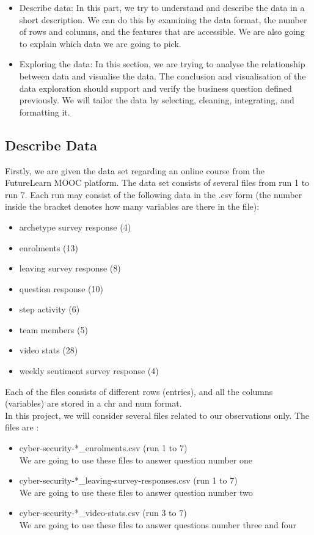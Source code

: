 \documentclass[12pt,]{article}
\providecommand{\tightlist}{%
\setlength{\itemsep}{0pt}\setlength{\parskip}{0pt}}
\begin{document}
\begin{itemize}
\item
  Describe data: In this part, we try to understand and describe the
  data in a short description. We can do this by examining the data
  format, the number of rows and columns, and the features that are
  accessible. We are also going to explain which data we are going to
  pick.
\item
  Exploring the data: In this section, we are trying to analyse the
  relationship between data and visualise the data. The conclusion and
  visualisation of the data exploration should support and verify the
  business question defined previously. We will tailor the data by
  selecting, cleaning, integrating, and formatting it.
\end{itemize}

\hypertarget{describe-data}{%
\subsection{Describe Data}\label{describe-data}}

Firstly, we are given the data set regarding an online course from the
FutureLearn MOOC platform. The data set consists of several files from
run 1 to run 7. Each run may consist of the following data in the .csv
form (the number inside the bracket denotes how many variables are there
in the file):

\begin{itemize}
\tightlist
\item
  archetype survey response (4)
\item
  enrolments (13)
\item
  leaving survey response (8)
\item
  question response (10)
\item
  step activity (6)
\item
  team members (5)
\item
  video stats (28)
\item
  weekly sentiment survey response (4)
\end{itemize}

\noindent Each of the files consists of different rows (entries), and
all the columns (variables) are stored in a chr and num format.\\
\hfill\break In this project, we will consider several files related to
our observations only. The files are :

\begin{itemize}
\tightlist
\item
  cyber-security-*\_enrolments.csv (run 1 to 7)\\
  We are going to use these files to answer question number one
\item
  cyber-security-*\_leaving-survey-responses.csv (run 1 to 7)\\
  We are going to use these files to answer question number two
\item
  cyber-security-*\_video-stats.csv (run 3 to 7)\\
  We are going to use these files to answer questions number three and
  four
\end{itemize}
\end{document}
